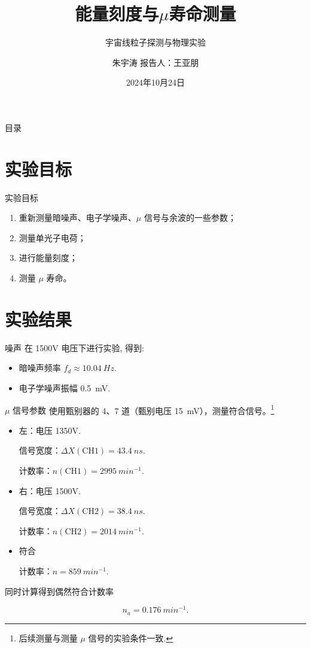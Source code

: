 \documentclass[10pt]{beamer}
\author{朱宇涛 \quad 报告人：王亚朋}
\date{2024年10月24日}
\title{能量刻度与\(\mu\)寿命测量}
\subtitle{宇宙线粒子探测与物理实验}
\newcommand{\mr}[1]{\mathrm{#1}}
\begin{document}
\maketitle
\begin{frame}[label={sec:orgda6a2a1}]{目录}
\tableofcontents
\end{frame}
\section{实验目标}
\label{sec:orgab3997e}
\begin{frame}[label={sec:org1f21a4c}]{实验目标}
\begin{enumerate}
\item 重新测量暗噪声、电子学噪声、\(\mu\) 信号与余波的一些参数；
\item 测量单光子电荷；
\item 进行能量刻度；
\item 测量 \(\mu\) 寿命。
\end{enumerate}
\end{frame}
\section{实验结果}
\label{sec:org8a2b7fc}
\begin{frame}[label={sec:orgcc7d0c2}]{噪声}
在 1500V 电压下进行实验, 得到:
\begin{itemize}
\item 暗噪声频率 \(f_{d} \approx \qty{10.04}{Hz}\).
\item 电子学噪声振幅 \qty{0.5}{mV}.
\end{itemize}
\end{frame}

\begin{frame}[label={sec:org9e0dfb2}]{\(\mu\) 信号参数}
使用甄别器的 4、7 道（甄别电压 \qty{15}{mV}），测量符合信号。\footnote{后续测量与测量 \(\mu\) 信号的实验条件一致.}

\begin{itemize}
\item 左：电压 1350V.

信号宽度：\(\Delta X(\mr{CH1}) = \qty{43.4}{ns}\).

计数率：\(n(\mr{CH1}) = \qty{2995}{min^{-1}}\).

\item 右：电压 1500V.

信号宽度：\(\Delta X(\mr{CH2}) = \qty{38.4}{ns}\).

计数率：\(n(\mr{CH2}) = \qty{2014}{min^{-1}}\).

\item 符合

计数率：\(n = \qty{859}{min^{-1}}\).
\end{itemize}

同时计算得到偶然符合计数率

\begin{equation}
\label{eq:1}
n_a = \qty{0.176}{min^{-1}}.
\end{equation}
\end{frame}
\end{document}
